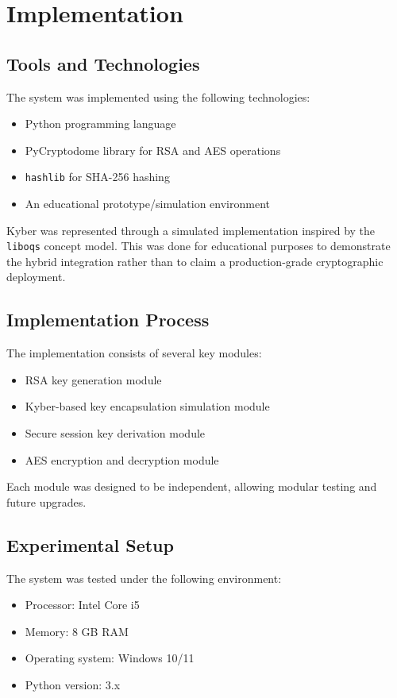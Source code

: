 \documentclass[12pt,a4paper]{article}
\begin{document}
\section{Implementation}

\subsection{Tools and Technologies}

The system was implemented using the following technologies:
\begin{itemize}[leftmargin=2em]
    \item Python programming language
    \item PyCryptodome library for RSA and AES operations
    \item \texttt{hashlib} for SHA-256 hashing
    \item An educational prototype/simulation environment
\end{itemize}

Kyber was represented through a simulated implementation inspired by the \texttt{liboqs} concept model. This was done for educational purposes to demonstrate the hybrid integration rather than to claim a production-grade cryptographic deployment.

\subsection{Implementation Process}

The implementation consists of several key modules:
\begin{itemize}[leftmargin=2em]
    \item RSA key generation module
    \item Kyber-based key encapsulation simulation module
    \item Secure session key derivation module
    \item AES encryption and decryption module
\end{itemize}

Each module was designed to be independent, allowing modular testing and future upgrades.

\subsection{Experimental Setup}

The system was tested under the following environment:
\begin{itemize}[leftmargin=2em]
    \item Processor: Intel Core i5
    \item Memory: 8 GB RAM
    \item Operating system: Windows 10/11
    \item Python version: 3.x
\end{itemize}
\end{document}
